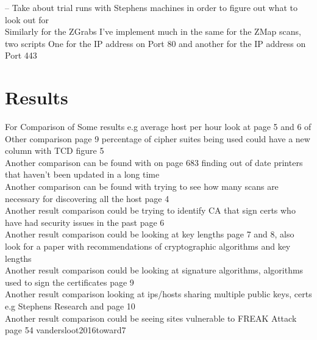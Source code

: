 \documentclass[a4wide,leqno,12pt]{report}
\begin{document}
-- Take about trial runs with Stephens machines in order to figure out what to look out for\\

Similarly for the ZGrabs I've implement much in the same for the ZMap scans, two scripts One for the IP address on Port 80 and another for the IP address on Port 443 


\chapter{Results}

For Comparison of Some results e.g average host per hour look at page 5 and 6 of \cite{durumeric2013zmap}\\

Other comparison \cite{durumeric2015search} page 9 percentage of cipher suites being used could have a new column with TCD figure 5\\

Another comparison can be found with \cite{lee2016implementation} on page 683 finding out of date printers that haven't been updated in a long time\\

Another comparison can be found with trying to see how many scans are necessary for discovering all the host \cite{durumeric2013analysis} page 4\\

Another result comparison could be trying to identify CA that sign certs who have had security issues in the past \cite{durumeric2013analysis} page 6\\

Another result comparison could be looking at key lengths \cite{durumeric2013analysis} page 7 and 8, also look for a paper with recommendations of cryptographic algorithms and key lengths\\ 

Another result comparison could be looking at signature algorithms, algorithms used to sign the certificates \cite{durumeric2013analysis} page 9\\

Another result comparison looking at ips/hosts sharing multiple public keys, certs e.g Stephens Research and \cite{durumeric2013analysis} page 10\\

Another result comparison could be seeing sites vulnerable to FREAK Attack \cite{vandersloot2016toward} page 54
vandersloot2016toward7\\
\end{document}
